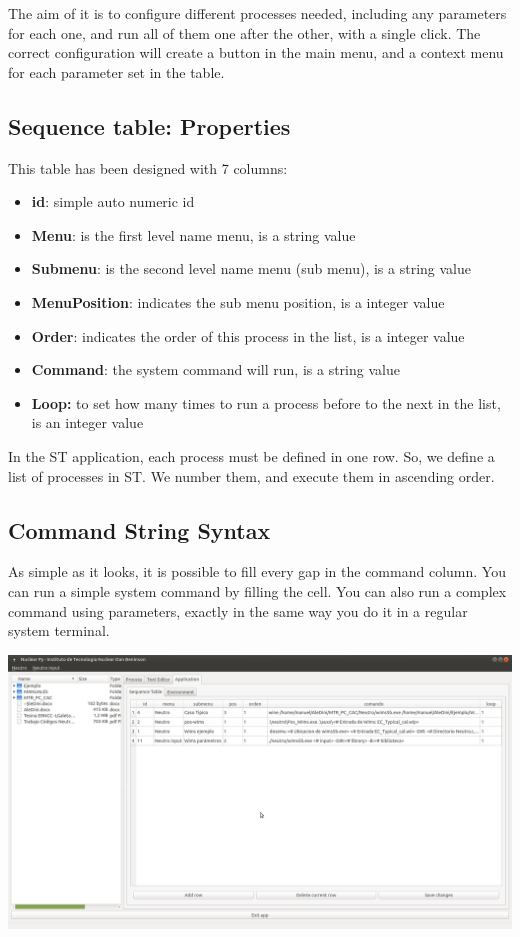 \documentclass[a4paper,10pt]{article}
\begin{document}
The aim of it is to configure different processes needed, including any parameters for each one, and run all of them one after the other, with a single click. The correct configuration will create a button in the main menu, and a context menu for each parameter set in the table.

\subsection{Sequence table: Properties}
This table has been designed with 7 columns:

\begin{itemize}
    \item \textbf{id}: simple auto numeric id
    \item \textbf{Menu}: is the first level name menu, is a string value
    \item \textbf{Submenu}: is the second level name menu (sub menu), is a string value
    \item \textbf{MenuPosition}: indicates the sub menu position, is a integer value
    \item \textbf{Order}: indicates the order of this process in the list, is a integer value
    \item \textbf{Command}: the system command will run, is a string value
    \item \textbf{Loop:} to set how many times to run a process before to the next in the list, is an integer value
\end{itemize}

In the ST application, each process must be defined in one row. So, we define a list of processes in ST. We number them, and execute them in ascending order.

\subsection{Command String Syntax}

As simple as it looks, it is possible to fill every gap in the command column. You can run a simple system command by filling the cell. You can also run a complex command using parameters, exactly in the same way you do it in a regular system terminal.

\begin{center}
 \includegraphics[width=\textwidth]{img/sequenceTable.png}
\end{center}
\end{document}
